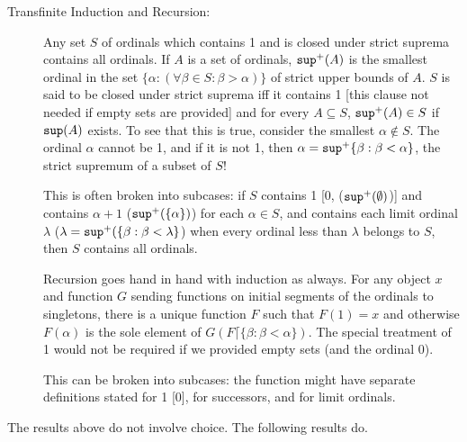 \documentclass[12pt]{article}
\begin{document}
\begin{description}
\item[Transfinite Induction and Recursion:]  Any set $S$ of ordinals which contains 1 and is closed under strict suprema contains all ordinals.  If $A$ is a set of ordinals, ${\tt sup}^+(A)$ is the smallest ordinal in the set \newline  $\{\alpha:(\forall \beta \in S:\beta > \alpha)\}$ of strict upper bounds of $A$.   $S$ is said to be closed under strict suprema iff it contains 1 [this clause not needed if empty sets are provided] and  for every $A \subseteq S$, ${\tt sup}^+(A) \in S$ if ${\tt sup}(A)$ exists.  To see that this is true, consider the smallest $\alpha \not\in S$.  The ordinal $\alpha$ cannot be 1, and if it is not 1, then $\alpha = {\tt sup}^+\{\beta:\beta <\alpha\}$, the strict supremum of a subset of $S$!

This is often broken into subcases:  if $S$ contains 1 [0, (${\tt sup}^+(\emptyset)$)] and contains $\alpha+1$ (${\tt sup}^+(\{\alpha\})$) for each $\alpha\in S$, and contains each limit ordinal $\lambda$ ($\lambda = {\tt sup}^+(\{\beta:\beta<\lambda\}$) when every ordinal less than $\lambda$ belongs to $S$, then $S$ contains all ordinals.

Recursion goes hand in hand with induction as always.  For any object $x$ and function $G$ sending functions on initial segments of the ordinals to singletons, there is a unique function $F$ such that $F(1)=x$ and otherwise $F(\alpha)$ is the sole element of $G(F \lceil \{\beta:\beta<\alpha\})$.  The special treatment of 1 would not be required if we provided empty sets (and the ordinal 0).

This can be broken into subcases:  the function might have separate definitions stated for 1 [0], for successors, and for limit ordinals.

\end{description}

The results above do not involve choice.  The following results do.
\end{document}
